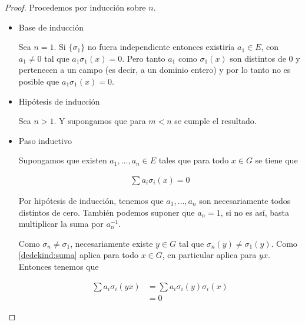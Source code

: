 \begin{proof}
    Procedemos por inducción sobre $n$. 
    
    \begin{itemize}
        \item Base de inducción\par\null
            Sea $n = 1$. Si $\{\sigma_1\}$ no fuera independiente entonces existiría $a_1 \in E$, con $a_1 \not= 0$ 
            tal que $a_1 \sigma_1(x) = 0$. Pero tanto $a_1$ como $\sigma_1(x)$ son distintos de $0$ y pertenecen a un campo
            (es decir, a un dominio entero) y por lo tanto no es posible que $a_1 \sigma_1(x) = 0$.\par\null   
                    
         \item Hipótesis de inducción\par\null
            Sea $n>1$. Y supongamos que para $m < n$ se cumple el resultado.\par\null
                    
         \item Paso inductivo\par\null
            Supongamos que existen $a_1, \dots, a_n \in E$ tales que para todo $x \in G$ se tiene que
                  
            \begin{align}
                    \sum a_i \sigma_i(x) = 0 \label{dedekind:suma} 
            \end{align}\par\null
            
            Por hipótesis de inducción, tenemos que $a_1, \dots, a_n$ son necesariamente todos distintos de cero.
            También podemos suponer que $a_n = 1$, si no es así, basta multiplicar la suma por $a_n^{-1}$.\par\null
            
            Como $\sigma_n \not= \sigma_1$, necesariamente existe $y \in G$ tal que $\sigma_n(y) \not= \sigma_1(y)$.
            Como \eqref{dedekind:suma} aplica para todo $x \in G$, en particular aplica para $yx$. Entonces tenemos que
    
            \begin{align}
                    \sum a_i \sigma_i(yx)   &=  \sum a_i \sigma_i(y)\sigma_i(x) \\
                                            &=  0 
            \end{align}
            

\end{itemize}
\end{proof}
